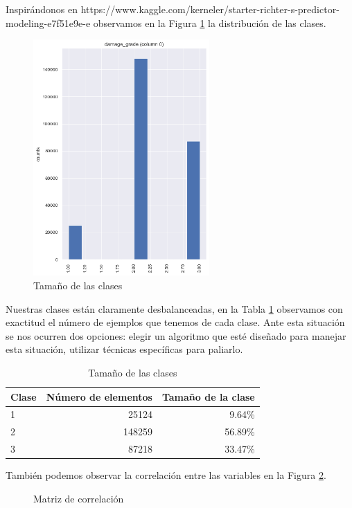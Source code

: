 \documentclass[a4paper, 20pt]{article}
\begin{document}
Inspirándonos en 
https://www.kaggle.com/kerneler/starter-richter-s-predictor-modeling-e7f51e9e-e
observamos en la Figura \ref{fig:tam_clases} la distribución de las clases.

\begin{figure}[H]
    \centering
    \includegraphics[height=0.6\textwidth, width=0.6\textwidth]{260601_dist}
    \caption{Tamaño de las clases}
    \label{fig:tam_clases}
\end{figure}

Nuestras clases están claramente desbalanceadas, en la Tabla \ref{tab:tam_clas} observamos con exactitud el número de ejemplos que tenemos de cada clase. Ante esta situación se nos ocurren dos opciones: elegir un algoritmo que esté diseñado para manejar esta situación, utilizar técnicas específicas para paliarlo.

\begin{table}[H]
\centering
\caption{Tamaño de las clases}
\label{tab:tam_clas}
\begin{tabular}{lrr}
\toprule
Clase & Número de elementos & Tamaño de la clase\\
\midrule
1 & 25124 & 9.64\%\\
2 & 148259 & 56.89\%\\
3 & 87218 & 33.47\%\\
\bottomrule
\end{tabular}
\end{table}

También podemos observar la correlación entre las variables en la Figura \ref{fig:corr_matrix}.


\begin{figure}[H]
  \centering
  
  \caption{Matriz de correlación}
  \label{fig:corr_matrix}
\end{figure}
\end{document}
